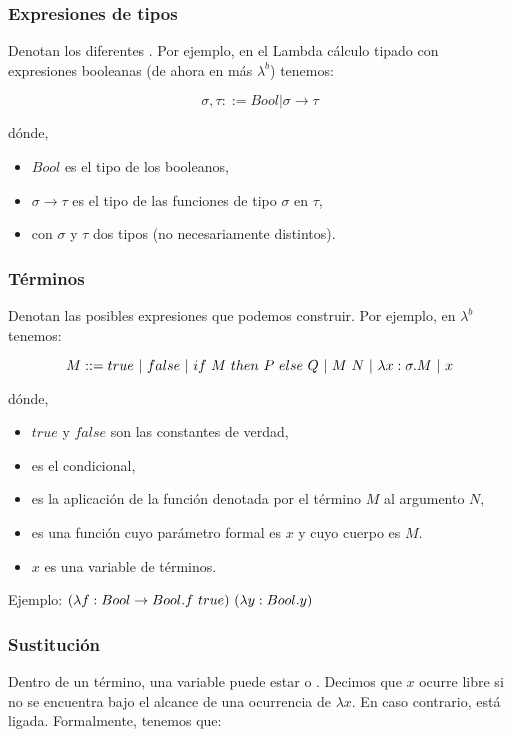\subsubsection{Expresiones de tipos}

Denotan los diferentes . Por ejemplo, en el Lambda cálculo tipado con expresiones booleanas (de ahora en más $\lambda^b$) tenemos:

\[ \sigma, \tau ::= Bool|\sigma\to\tau \]

dónde,
\begin{itemize}
  \item $Bool$ es el tipo de los booleanos,
  \item $\sigma\to\tau$ es el tipo de las funciones de tipo $\sigma$ en $\tau$,
  \item con $\sigma$ y $\tau$ dos tipos (no necesariamente distintos).
\end{itemize}

\subsubsection{Términos}

Denotan las posibles expresiones que podemos construir. Por ejemplo, en $\lambda^b$ tenemos:

\[ M ::= true \ |\  false \ |\  if\ M\ then\ P\ else\ Q \ |\  M\ N \ |\  \lambda x:\sigma.M \ |\  x \]

dónde,
\begin{itemize}
  \item $true$ y $false$ son las constantes de verdad,
  \item {} es el condicional,
  \item {} es la aplicación de la función denotada por el término $M$ al argumento $N$,
  \item {} es una función cuyo parámetro formal es $x$ y cuyo cuerpo es $M$.
  \item $x$ es una variable de términos.
\end{itemize}

Ejemplo: $\app{(\abs{f}{Bool \to Bool}{f\ true})}{(\abs{y}{Bool}{y})}$

\subsubsection{Sustitución}

Dentro de un término, una variable puede estar  o . Decimos que $x$ ocurre libre si no se encuentra bajo el alcance de una ocurrencia de $\lambda x$. En caso contrario, está ligada. Formalmente, tenemos que:

